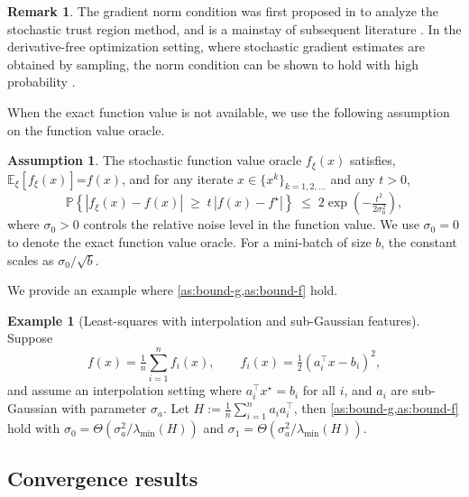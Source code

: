 \documentclass{article}
\theoremstyle{definition}
\newtheorem{remark}[remark]{Remark}
\newtheorem{assumption}{Assumption}[section]
\newtheorem{example}[example]{Example}
\newcommand{\assign}{:=}
\begin{document}
\begin{remark}
  The gradient norm condition was first proposed in {\cite{carter1991global}}
  to analyze the stochastic trust region method, and is a mainstay of subsequent
  literature {\cite{berahas2021global,byrd2012sample}}. 
  In the derivative-free optimization setting, where stochastic gradient estimates are obtained by sampling, 
  the norm condition can be shown to hold with high probability {\cite{berahas2022theoretical}}.
\end{remark}

When the exact function value is not available, we use the following assumption on the function value oracle.

\begin{assumption}
  \label{as:bound-f}
  The stochastic function value oracle $f_{\xi} (x)$ satisfies,
  $\mathbb{E}_{\xi} [f_{\xi} (x)]$=$f (x)$, and for any iterate 
$x \in \{x^k\}_{k=1,2,\ldots}$ and any $t>0$,
\begin{equation}\label{eq:hp-function-oracle}
    \mathbb{P}\!\left\{
        |f_{\xi}(x) - f(x)| 
        \;\ge\; t \, |f(x) - f^\star|
    \right\}
    \;\le\;
    2\exp\!\left( -\tfrac{t^{2}}{2\sigma_0^{2}} \right),
\end{equation}
where $\sigma_0 > 0$ controls the relative noise level in the function value. 
We use $\sigma_0 = 0$ to denote the exact function value oracle. 
For a mini-batch of size $b$, the constant scales as $\sigma_0 / \sqrt{b}$.
\end{assumption}

We provide an example where \cref{as:bound-g,as:bound-f} hold. 
\begin{example}[Least-squares with interpolation and sub-Gaussian features]
\label{ex:gradient-norm}
Suppose
\[
    f(x) = \tfrac{1}{n} \textstyle \sum_{i=1}^n f_i(x),
    \qquad
    f_i(x) = \tfrac12 (a_i^\top x - b_i)^2,
\]
and assume an interpolation setting where $a_i^\top x^\star = b_i$ for all $i$, and $a_i$ are sub-Gaussian with parameter $\sigma_a$. Let $H \assign \tfrac1n \sum_{i=1}^n a_i a_i^\top$, then \cref{as:bound-g,as:bound-f} hold with $\sigma_0 = \Theta(\sigma_a^{2}/\lambda_{\min}(H))$ and $\sigma_1 = \Theta(\sigma_a^{2}/\lambda_{\min}(H))$. 
\end{example}

\subsection{Convergence results}
\end{document}

